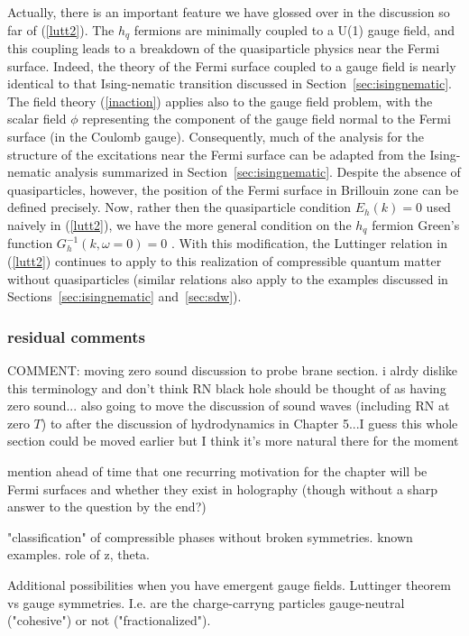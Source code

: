 \documentclass[10pt, oneside]{book}
\begin{document}
\begin{doublespace}
Actually, there is an important feature we have glossed over in the discussion so far of (\ref{lutt2}).
The $h_q$ fermions are minimally coupled to a U(1) gauge field, and this coupling leads to a breakdown of the quasiparticle
physics near the Fermi surface. Indeed, the theory of the Fermi surface coupled to a gauge field \cite{metlitski1,mross} is nearly identical to that Ising-nematic
transition discussed in Section~\ref{sec:isingnematic}. The field theory (\ref{inaction}) applies also to the gauge field problem,
with the scalar field $\phi$ representing the component of the gauge field normal to the Fermi surface (in the Coulomb gauge).
Consequently, 
much of the analysis for the structure of the excitations near the Fermi surface can be adapted from the Ising-nematic analysis
summarized in Section~\ref{sec:isingnematic}. Despite the absence of quasiparticles, however, the position of the Fermi surface
in Brillouin zone can be defined precisely. Now, rather then the quasiparticle condition $E_h (k) = 0$ used naively in (\ref{lutt2}),
we have the more general condition on the $h_q$ fermion Green's function $G_h^{-1} (k, \omega = 0 ) = 0$ \cite{sssolvay}.
With this modification, the Luttinger relation in (\ref{lutt2}) continues to apply to this realization of compressible quantum matter
without quasiparticles (similar relations also apply to the examples discussed in Sections~\ref{sec:isingnematic} and~\ref{sec:sdw}).




\subsubsection*{residual comments}


COMMENT:  moving zero sound discussion to probe brane section.   i alrdy dislike this terminology and  don't think RN black hole should be thought of as having zero sound...   also going to move the discussion of sound waves (including RN at zero $T$) to after the discussion of hydrodynamics in Chapter 5...I guess this whole section could be moved earlier but I think it's more natural there for the moment

mention ahead of time that one recurring motivation for the chapter will be Fermi surfaces and whether they exist in holography  (though without a sharp answer to the question by the end?)

"classification" of compressible phases without broken symmetries. known examples. role of z, theta.


Additional possibilities when you have emergent gauge fields. Luttinger theorem vs gauge symmetries. I.e. are the charge-carryng particles gauge-neutral ("cohesive") or not ("fractionalized").



\end{doublespace}
\end{document}
